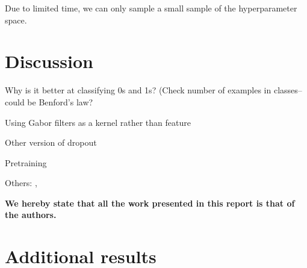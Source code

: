 \documentclass{acm_proc_article-sp}
\begin{document}
Due to limited time, we can only sample a small sample of the hyperparameter space.

\section{Discussion}%
Why is it better at classifying 0s and 1s? (Check number of examples in classes--could be Benford's law?

Using Gabor filters as a kernel rather than feature \cite{Sabri}

Other version of dropout \cite{Wan}

Pretraining \cite{Erhan}

Others: \cite{Rowley}, \cite{Simard}

{\bfseries We hereby state that all the work presented in this report is that of the authors.}




\appendix
\label{appendix}

\section{Additional results}
\label{sec:additional-results}
\end{document}
